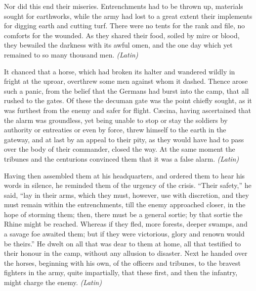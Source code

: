 Nor did this end their miseries. Entrenchments had to be thrown up, materials sought for earthworks, while the army had lost to a great extent their implements for digging earth and cutting turf. There were no tents for the rank and file, no comforts for the wounded. As they shared their food, soiled by mire or blood, they bewailed the darkness with its awful omen, and the one day which yet remained to so many thousand men. \emph{(Latin)}


It chanced that a horse, which had broken its halter and wandered wildly in fright at the uproar, overthrew some men against whom it dashed. Thence arose such a panic, from the belief that the Germans had burst into the camp, that all rushed to the gates. Of these the decuman gate was the point chiefly sought, as it was furthest from the enemy and safer for flight. Cæcina, having ascertained that the alarm was groundless, yet being unable to stop or stay the soldiers by authority or entreaties or even by force, threw himself to the earth in the gateway, and at last by an appeal to their pity, as they would have had to pass over the body of their commander, closed the way. At the same moment the tribunes and the centurions convinced them that it was a false alarm. \emph{(Latin)}


Having then assembled them at his headquarters, and ordered them to hear his words in silence, he reminded them of the urgency of the crisis. ``Their safety,'' he said, ``lay in their arms, which they must, however, use with discretion, and they must remain within the entrenchments, till the enemy approached closer, in the hope of storming them; then, there must be a general sortie; by that sortie the Rhine might be reached. Whereas if they fled, more forests, deeper swamps, and a savage foe awaited them; but if they were victorious, glory and renown would be theirs.'' He dwelt on all that was dear to them at home, all that testified to their honour in the camp, without any allusion to disaster. Next he handed over the horses, beginning with his own, of the officers and tribunes, to the bravest fighters in the army, quite impartially, that these first, and then the infantry, might charge the enemy. \emph{(Latin)}


